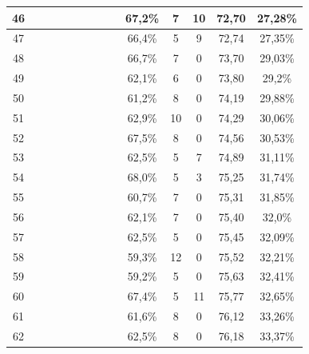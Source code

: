 \begin{longtable}{|c|c|c|c|c|c|c|c|c|c|c|c|c|c|}
46  &  \x    & \x    & \x    &       & \x\m  &       &       & \x\m  & 67,2\% &  7  & 10 & 72,70 & 27,28\% \\ \hline
47  &  \x    & \x    & \x    &       & \x\m  & \x    &       & \x    & 66,4\% &  5  & 9  & 72,74 & 27,35\% \\ \hline
48  &  \x    & \x    & \x    & \x    & \x\m  &       &       &       & 66,7\% &  7  & 0  & 73,70 & 29,03\% \\ \hline
49  &  \x    & \x    & \x    & \x    &       & \x    & \x\m  &       & 62,1\% &  6  & 0  & 73,80 & 29,2\% \\ \hline
50  &  \x    & \x    & \x    & \x    &       & \x\m  & \x\m  &       & 61,2\% &  8  & 0  & 74,19 & 29,88\% \\ \hline
51  &  \x    & \x    & \x    & \x    & \x    &       & \x\m  &       & 62,9\% &  10 & 0  & 74,29 & 30,06\% \\ \hline
52  &  \x    & \x    & \x    &       & \x\m  & \x    &       &       & 67,5\% &  8  & 0  & 74,56 & 30,53\% \\ \hline
53  &  \x    & \x    & \x    &       & \x    & \x\m  & \x\m  &       & 62,5\% &  5  & 7  & 74,89 & 31,11\% \\ \hline
54  &  \x    & \x    & \x    &       & \x\m  & \x    &       & \x\m  & 68,0\% &  5  & 3  & 75,25 & 31,74\% \\ \hline
55  &  \x    & \x    & \x    & \x    &       & \x\m  &       & \x\m  & 60,7\% &  7  & 0  & 75,31 & 31,85\% \\ \hline
56  &  \x    & \x    & \x    & \x    & \x    & \x    & \x\m  &       & 62,1\% &  7  & 0  & 75,40 & 32,0\% \\ \hline
57  &  \x    & \x    & \x    & \x    & \x    & \x\m  &       &       & 62,5\% &  5  & 0  & 75,45 & 32,09\% \\ \hline
58  &  \x    & \x    & \x    &       &       &       &       & \x\m  & 59,3\% &  12 & 0  & 75,52 & 32,21\% \\ \hline
59  &  \x    & \x    & \x    &       &       & \x    &       &       & 59,2\% &  5  & 0  & 75,63 & 32,41\% \\ \hline
60  &  \x    & \x    & \x    &       & \x\m  &       &       &       & 67,4\% &  5  & 11 & 75,77 & 32,65\% \\ \hline
61  &  \x    & \x    & \x    & \x    &       & \x\m  &       & \x\m  & 61,6\% &  8  & 0  & 76,12 & 33,26\% \\ \hline
62  &  \x    & \x    & \x    & \x    &       &       & \x\m  &       & 62,5\% &  8  & 0  & 76,18 & 33,37\% \\ \hline

\end{longtable}
